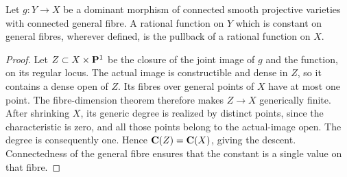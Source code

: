 \begin{lemma}\label{lem:rational-descent}
Let $g:Y\to X$ be a dominant morphism of connected smooth projective varieties with connected general fibre. A rational function on $Y$ which is constant on general fibres, wherever defined, is the pullback of a rational function on $X$.
\end{lemma}

\begin{proof}
Let $Z\subset X\times\mathbf P^1$ be the closure of the joint image of $g$ and the function, on its regular locus. The actual image is constructible and dense in $Z$, so it contains a dense open of $Z$. Its fibres over general points of $X$ have at most one point. The fibre-dimension theorem therefore makes $Z\to X$ generically finite. After shrinking $X$, its generic degree is realized by distinct points, since the characteristic is zero, and all those points belong to the actual-image open. The degree is consequently one. Hence $\mathbf C(Z)=\mathbf C(X)$, giving the descent. Connectedness of the general fibre ensures that the constant is a single value on that fibre.
\end{proof}
